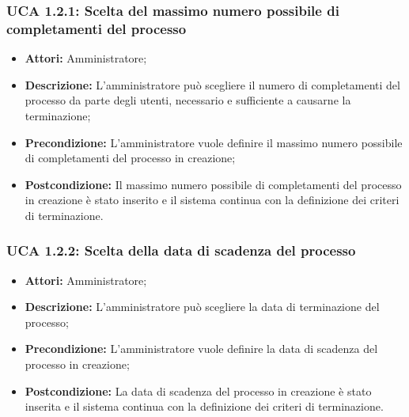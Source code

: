 \hypertarget{A1.2.1}{}
\subsubsection{UCA 1.2.1: Scelta del massimo numero possibile di completamenti del processo}

\begin{itemize}
\item \textbf{Attori:}
Amministratore;
\item \textbf{Descrizione:}
L'amministratore può scegliere il numero di completamenti del processo da parte degli utenti, necessario e sufficiente a causarne la terminazione;
\item \textbf{Precondizione:}
L'amministratore vuole definire il massimo numero possibile di completamenti del processo in creazione;
\item \textbf{Postcondizione:}
Il massimo numero possibile di completamenti del processo in creazione è stato inserito e il sistema continua con la definizione dei criteri di terminazione.
\end{itemize}

\hypertarget{A1.2.2}{}
\subsubsection{UCA 1.2.2: Scelta della data di scadenza del processo}

\begin{itemize}
\item \textbf{Attori:}
Amministratore;
\item \textbf{Descrizione:}
L'amministratore può scegliere la data di terminazione del processo;
\item \textbf{Precondizione:}
L'amministratore vuole definire la data di scadenza del processo in creazione;
\item \textbf{Postcondizione:}
La data di scadenza del processo in creazione è stato inserita e il sistema continua con la definizione dei criteri di terminazione.
\end{itemize}

\hypertarget{A1.3}{}
